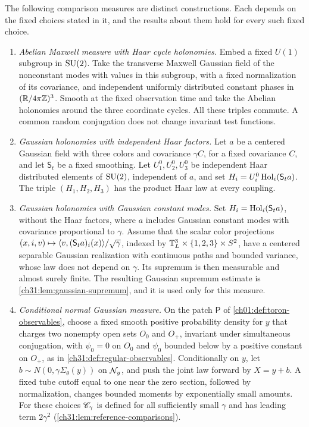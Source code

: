 \begin{definition}\label{ch01:def:references}
The following comparison measures are distinct constructions. Each depends on the fixed choices stated in it, and the results about them hold for every such fixed choice.
\begin{enumerate}
\item \emph{Abelian Maxwell measure with Haar cycle holonomies.} Embed a fixed $U(1)$ subgroup in $\mathrm{SU}(2)$. Take the transverse Maxwell Gaussian field of the nonconstant modes with values in this subgroup, with a fixed normalization of its covariance, and independent uniformly distributed constant phases in $(\mathbb R/4\pi\mathbb Z)^3$. Smooth at the fixed observation time and take the Abelian holonomies around the three coordinate cycles. All these triples commute. A common random conjugation does not change invariant test functions.
\item \emph{Gaussian holonomies with independent Haar factors.} Let $a$ be a centered Gaussian field with three colors and covariance $\gamma C$, for a fixed covariance $C$, and let $\mathsf S_t$ be a fixed smoothing. Let $U_1^0,U_2^0,U_3^0$ be independent Haar distributed elements of $\mathrm{SU}(2)$, independent of $a$, and set $H_i=U_i^0\operatorname{Hol}_i(\mathsf S_ta)$. The triple $(H_1,H_2,H_3)$ has the product Haar law at every coupling.
\item \emph{Gaussian holonomies with Gaussian constant modes.} Set $H_i=\operatorname{Hol}_i(\mathsf S_ta)$, without the Haar factors, where $a$ includes Gaussian constant modes with covariance proportional to $\gamma$. Assume that the scalar color projections $(x,i,v)\mapsto\langle v,(\mathsf S_ta)_i(x)\rangle/\sqrt\gamma$, indexed by $\mathbb T_L^3\times\{1,2,3\}\times S^2$, have a centered separable Gaussian realization with continuous paths and bounded variance, whose law does not depend on $\gamma$. Its supremum is then measurable and almost surely finite. The resulting Gaussian supremum estimate is \cref{ch31:lem:gaussian-supremum}, and it is used only for this measure.
\item \emph{Conditional normal Gaussian measure.} On the patch $\mathsf P$ of \cref{ch01:def:toron-observables}, choose a fixed smooth positive probability density for $y$ that charges two nonempty open sets $O_0$ and $O_+$, invariant under simultaneous conjugation, with $\psi_0=0$ on $O_0$ and $\psi_0$ bounded below by a positive constant on $O_+$, as in \cref{ch31:def:regular-observables}. Conditionally on $y$, let $b\sim N(0,\gamma\Sigma_\theta(y))$ on $\mathcal N_{y}$, and push the joint law forward by $X=y+b$. A fixed tube cutoff equal to one near the zero section, followed by normalization, changes bounded moments by exponentially small amounts. For these choices $\mathscr C_\gamma$ is defined for all sufficiently small $\gamma$ and has leading term $2\gamma^2$ (\cref{ch31:lem:reference-comparisons}).

\end{enumerate}
\end{definition}
